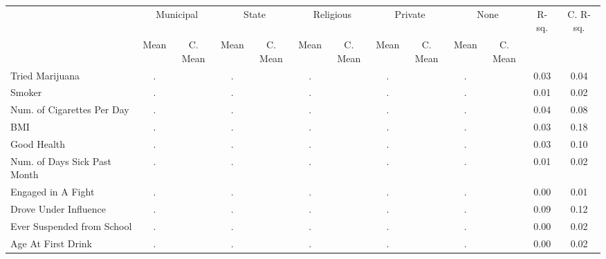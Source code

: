 \begin{tabular}{l c c c c c c c c c c c c}
\toprule
& \multicolumn{2}{c}{Municipal} & \multicolumn{2}{c}{State} & \multicolumn{2}{c}{Religious} & \multicolumn{2}{c}{Private} & \multicolumn{2}{c}{None} & R-sq. & C. R-sq. \\
& \scriptsize Mean & \scriptsize C. Mean & \scriptsize Mean & \scriptsize C. Mean & \scriptsize Mean & \scriptsize C. Mean & \scriptsize Mean & \scriptsize C. Mean & \scriptsize Mean & \scriptsize C. Mean & & \\
\midrule
Tried Marijuana &         . & &         . & &         . & &         . & &         . & &      0.03 &      0.04 \\
Smoker &         . & &         . & &         . & &         . & &         . & &      0.01 &      0.02 \\
Num. of Cigarettes Per Day &         . & &         . & &         . & &         . & &         . & &      0.04 &      0.08 \\
BMI &         . & &         . & &         . & &         . & &         . & &      0.03 &      0.18 \\
Good Health &         . & &         . & &         . & &         . & &         . & &      0.03 &      0.10 \\
Num. of Days Sick Past Month &         . & &         . & &         . & &         . & &         . & &      0.01 &      0.02 \\
Engaged in A Fight  &         . & &         . & &         . & &         . & &         . & &      0.00 &      0.01 \\
Drove Under Influence  &         . & &         . & &         . & &         . & &         . & &      0.09 &      0.12 \\
Ever Suspended from School &         . & &         . & &         . & &         . & &         . & &      0.00 &      0.02 \\
Age At First Drink &         . & &         . & &         . & &         . & &         . & &      0.00 &      0.02 \\
\bottomrule
\end{tabular}
